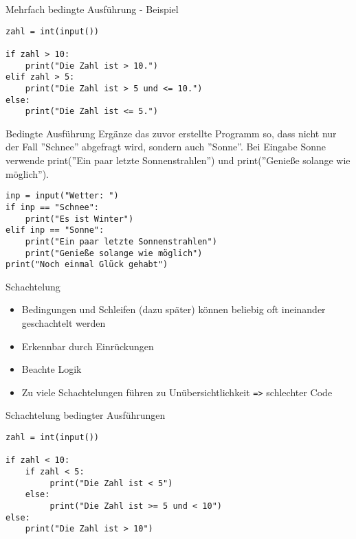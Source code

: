\begin{frame}[fragile]{Mehrfach bedingte Ausführung - Beispiel}
\begin{lstlisting}
zahl = int(input())

if zahl > 10:
    print("Die Zahl ist > 10.")
elif zahl > 5:
    print("Die Zahl ist > 5 und <= 10.")
else:
    print("Die Zahl ist <= 5.")
\end{lstlisting}
\end{frame}


\begin{frame}[fragile]{Bedingte Ausführung}
Ergänze das zuvor erstellte Programm so, dass nicht nur der Fall ''Schnee'' abgefragt wird, sondern auch ''Sonne''. Bei Eingabe Sonne verwende print(''Ein paar letzte Sonnenstrahlen'') und  print(''Genieße solange wie möglich'').
\pause{}
\begin{lstlisting}
inp = input("Wetter: ")
if inp == "Schnee":
    print("Es ist Winter")
elif inp == "Sonne":
    print("Ein paar letzte Sonnenstrahlen")
    print("Genieße solange wie möglich")
print("Noch einmal Glück gehabt")
\end{lstlisting}
\end{frame} 


\begin{frame}[fragile]{Schachtelung}
\begin{itemize}
	\item Bedingungen und Schleifen (dazu später) können beliebig oft ineinander geschachtelt werden
	\item Erkennbar durch Einrückungen
	\item Beachte Logik
	\item Zu viele Schachtelungen führen zu Unübersichtlichkeit \texttt{=>} schlechter Code
\end{itemize}
\end{frame}


\begin{frame}[fragile]{Schachtelung bedingter Ausführungen}

\begin{lstlisting}
zahl = int(input())

if zahl < 10:
    if zahl < 5:
	     print("Die Zahl ist < 5")
	else:
		 print("Die Zahl ist >= 5 und < 10")
else:
	print("Die Zahl ist > 10")
\end{lstlisting}
\end{frame}


